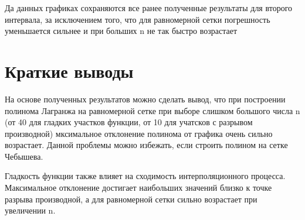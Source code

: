 Да данных графиках сохраняются все ранее полученные результаты для второго интервала, за исключением того, что для равномерной сетки погрешность уменьшается сильнее и при больших n не так быстро возрастает 

\section{Краткие выводы}

На основе полученных результатов можно сделать вывод, что при построении полинома Лагранжа на равномерной сетке при выборе слишком большого числа n (от 40 для гладких участков функции, от 10 для учатсков с разрывом производной) мксимальное отклонение полинома от графика очень сильно возрастает. Данной проблемы можно избежать, если строить полином на сетке Чебышева. 

Гладкость функции также влияет на сходимость интерполяционного процесса. Максимальное отклонение достигает наибольших значений близко к точке разрыва производной, а для равномерной сетки сильно возрастает при увеличении n. 


